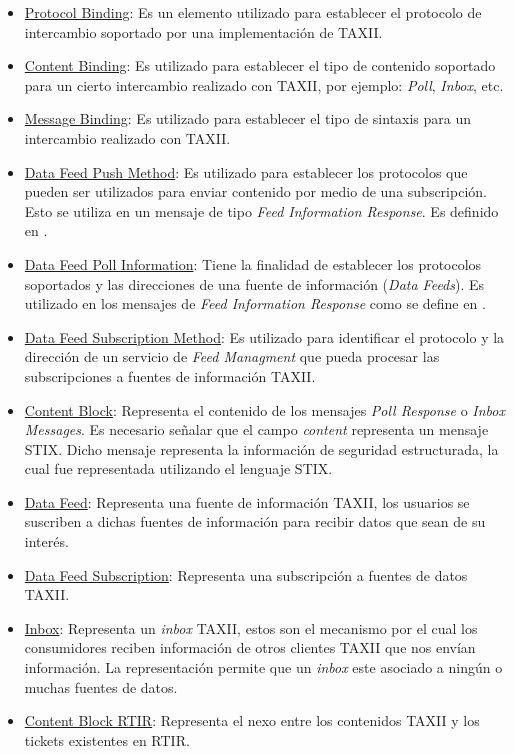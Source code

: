 	
	\begin{itemize}
		\item \underline{Protocol Binding}: Es un elemento utilizado para establecer el protocolo de intercambio
			soportado por una implementación de TAXII.
		\item \underline{Content Binding}: Es utilizado para establecer el tipo de contenido soportado para un
			cierto intercambio realizado con TAXII, por ejemplo:
		\textit{Poll},
	\textit{Inbox}, etc.
	\item \underline{Message Binding}: Es utilizado para establecer el tipo de sintaxis para un intercambio
		realizado con TAXII.
	\item \underline{Data Feed Push Method}: Es utilizado para establecer los protocolos que pueden ser
		utilizados para enviar contenido por medio de una subscripción. Esto se utiliza en un mensaje de tipo
	\textit{Feed Information Response}. Es definido en \cite{M14}.
	\item \underline{Data Feed Poll Information}: Tiene la finalidad de establecer los protocolos soportados y
		las direcciones de una fuente de información (\textit{Data
			Feeds}). Es utilizado en los mensajes de \textit{Feed Information
			Response} como se define en \cite{M14}.
	\item \underline{Data Feed Subscription Method}: Es utilizado para identificar el protocolo y la dirección
		de un servicio de \textit{Feed Managment} que pueda procesar las
		subscripciones a fuentes de información TAXII.
	\item \underline{Content Block}: Representa el contenido de los mensajes
\textit{Poll Response }o \textit{Inbox
		Messages}. Es necesario señalar que el campo
\textit{content} representa un mensaje STIX. Dicho mensaje
representa la información de seguridad estructurada, la cual fue representada utilizando el lenguaje STIX.
\item \underline{Data Feed}: Representa una fuente de información TAXII, los usuarios se suscriben a
	dichas fuentes de información para recibir datos que sean de su interés.
\item \underline{Data Feed Subscription}: Representa una subscripción a fuentes de datos TAXII.
\item \underline{Inbox}: Representa un \textit{inbox
	}TAXII, estos son el mecanismo por el cual los consumidores reciben información de otros
	clientes TAXII que nos envían información. La representación permite que un
\textit{inbox} este asociado a ningún o muchas fuentes de datos.

\item \underline{Content Block RTIR}: Representa el nexo entre los contenidos TAXII y los tickets
	existentes en RTIR.
\end{itemize}
